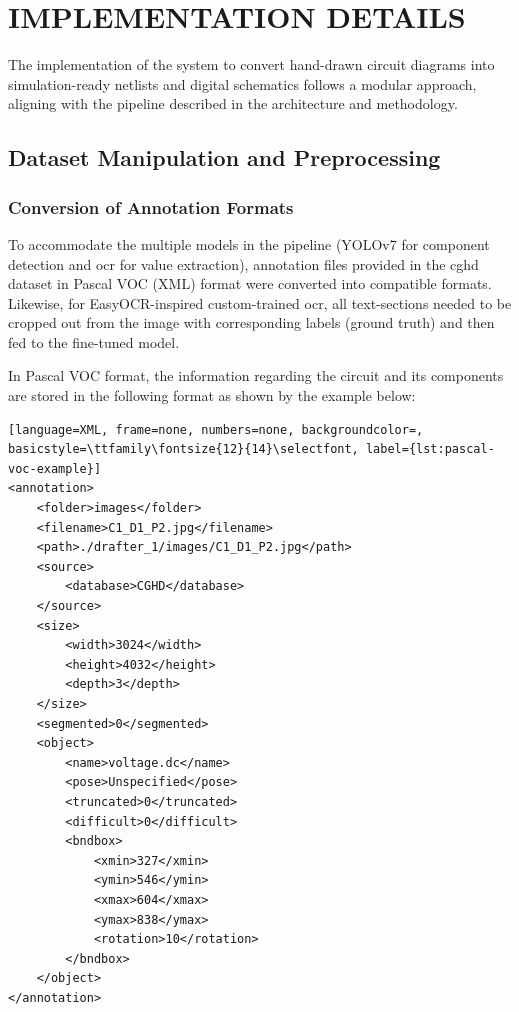\chapter{IMPLEMENTATION DETAILS}

The implementation of the system to convert hand-drawn circuit diagrams into simulation-ready netlists and digital schematics follows a modular approach, aligning with the pipeline described in the architecture and methodology.

\section{Dataset Manipulation and Preprocessing}

\subsection{Conversion of Annotation Formats}

To accommodate the multiple models in the pipeline (YOLOv7 for component detection and \gls{ocr} for value extraction), annotation files provided in the \gls{cghd} dataset in Pascal VOC (XML) format were converted into compatible formats. Likewise, for EasyOCR-inspired custom-trained \gls{ocr}, all text-sections needed to be cropped out from the image with corresponding labels (ground truth) and then fed to the fine-tuned model.

In Pascal VOC format, the information regarding the circuit and its components are stored in the following format as shown by the example below:

\begin{lstlisting}[language=XML, frame=none, numbers=none, backgroundcolor=, basicstyle=\ttfamily\fontsize{12}{14}\selectfont, label={lst:pascal-voc-example}]
<annotation>
    <folder>images</folder>
    <filename>C1_D1_P2.jpg</filename>
    <path>./drafter_1/images/C1_D1_P2.jpg</path>
    <source>
        <database>CGHD</database>
    </source>
    <size>
        <width>3024</width>
        <height>4032</height>
        <depth>3</depth>
    </size>
    <segmented>0</segmented>
    <object>
        <name>voltage.dc</name>
        <pose>Unspecified</pose>
        <truncated>0</truncated>
        <difficult>0</difficult>
        <bndbox>
            <xmin>327</xmin>
            <ymin>546</ymin>
            <xmax>604</xmax>
            <ymax>838</ymax>
            <rotation>10</rotation>
        </bndbox>
    </object>
</annotation>
\end{lstlisting}

